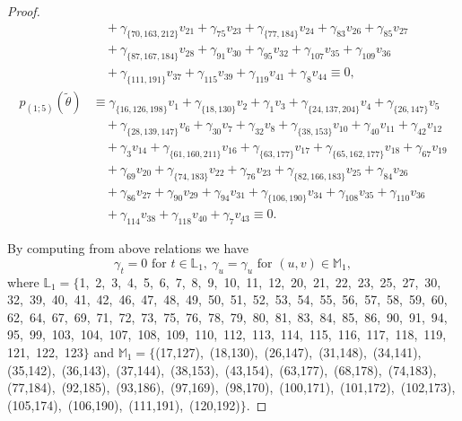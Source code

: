 \documentclass[reqno]{amsart}
\theoremstyle{plain}
\theoremstyle{definition}
\theoremstyle{plain}
\theoremstyle{definition}
\numberwithin{equation}{section}
\begin{document}
\begin{proof}
\begin{align*}
&\quad + \gamma_{\{70,163,212\}}v_{21} + \gamma_{75}v_{23} + \gamma_{\{77,184\}}v_{24} + \gamma_{83}v_{26} + \gamma_{85}v_{27}\\ 
&\quad + \gamma_{\{87,167,184\}}v_{28} + \gamma_{91}v_{30} + \gamma_{95}v_{32} + \gamma_{107}v_{35} + \gamma_{109}v_{36}\\ 
&\quad + \gamma_{\{111,191\}}v_{37} + \gamma_{115}v_{39} + \gamma_{119}v_{41} + \gamma_{8}v_{44} \equiv 0,\\
p_{(1;5)}(\widetilde\theta) &\equiv \gamma_{\{16,126,198\}}v_{1} + \gamma_{\{18,130\}}v_{2} + \gamma_{1}v_{3} + \gamma_{\{24,137,204\}}v_{4} + \gamma_{\{26,147\}}v_{5}\\ 
&\quad + \gamma_{\{28,139,147\}}v_{6} + \gamma_{30}v_{7} + \gamma_{32}v_{8} + \gamma_{\{38,153\}}v_{10} + \gamma_{40}v_{11} + \gamma_{42}v_{12}\\ 
&\quad + \gamma_{3}v_{14} + \gamma_{\{61,160,211\}}v_{16} + \gamma_{\{63,177\}}v_{17} + \gamma_{\{65,162,177\}}v_{18} + \gamma_{67}v_{19}\\ 
&\quad + \gamma_{69}v_{20} + \gamma_{\{74,183\}}v_{22} + \gamma_{76}v_{23} + \gamma_{\{82,166,183\}}v_{25} + \gamma_{84}v_{26}\\ 
&\quad + \gamma_{86}v_{27} + \gamma_{90}v_{29} + \gamma_{94}v_{31} + \gamma_{\{106,190\}}v_{34} + \gamma_{108}v_{35} + \gamma_{110}v_{36}\\ 
&\quad + \gamma_{114}v_{38} + \gamma_{118}v_{40} + \gamma_{7}v_{43} \equiv 0.
\end{align*}
	
By computing from above relations we have
\begin{equation}\label{c61}
\gamma_t = 0 \mbox{ for } t \in \mathbb L_1,\ \gamma_u= \gamma_u \mbox{ for } (u,v) \in \mathbb M_1,
\end{equation}
where $\mathbb L_1 = \{$1,\, 2,\, 3,\, 4,\, 5,\, 6,\, 7,\, 8,\, 9,\, 10,\, 11,\, 12,\, 20,\, 21,\, 22,\, 23,\, 25,\, 27,\, 30,\, 32,\, 39,\, 40,\, 41,\, 42,\, 46,\, 47,\, 48,\, 49,\, 50,\, 51,\, 52,\, 53,\, 54,\, 55,\, 56,\, 57,\, 58,\, 59,\, 60,\, 62,\, 64,\, 67,\, 69,\, 71,\, 72,\, 73,\, 75,\, 76,\, 78,\, 79,\, 80,\, 81,\, 83,\, 84,\, 85,\, 86,\, 90,\, 91,\, 94,\, 95,\, 99,\, 103,\, 104,\, 107,\, 108,\, 109,\, 110,\, 112,\, 113,\, 114,\, 115,\, 116,\, 117,\, 118,\, 119,\, 121,\, 122,\, 123$\}$ and $\mathbb M_1 = \{$(17,127),\, (18,130),\, (26,147),\, (31,148),\, (34,141),\, (35,142),\, (36,143),\, (37,144),\, (38,153),\, (43,154),\, (63,177),\, (68,178),\, (74,183),\, (77,184),\, (92,185),\, (93,186),\, (97,169),\, (98,170),\, (100,171),\, (101,172),\, (102,173),\, (105,174),\, (106,190),\, (111,191),\, (120,192)$\}$. 


\end{proof}
\end{document}
